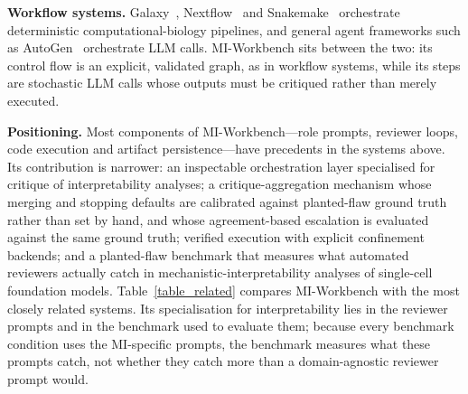 \noindent\textbf{Workflow systems.} Galaxy~\cite{afgan2018galaxy}, Nextflow~\cite{ditommaso2017nextflow} and Snakemake~\cite{molder2021sustainable} orchestrate deterministic computational-biology pipelines, and general agent frameworks such as AutoGen~\cite{wu2023autogen} orchestrate LLM calls. MI-Workbench sits between the two: its control flow is an explicit, validated graph, as in workflow systems, while its steps are stochastic LLM calls whose outputs must be critiqued rather than merely executed.

\noindent\textbf{Positioning.} Most components of MI-Workbench---role prompts, reviewer loops, code execution and artifact persistence---have precedents in the systems above. Its contribution is narrower: an inspectable orchestration layer specialised for critique of interpretability analyses; a critique-aggregation mechanism whose merging and stopping defaults are calibrated against planted-flaw ground truth rather than set by hand, and whose agreement-based escalation is evaluated against the same ground truth; verified execution with explicit confinement backends; and a planted-flaw benchmark that measures what automated reviewers actually catch in mechanistic-interpretability analyses of single-cell foundation models. Table~\ref{table_related} compares MI-Workbench with the most closely related systems. Its specialisation for interpretability lies in the reviewer prompts and in the benchmark used to evaluate them; because every benchmark condition uses the MI-specific prompts, the benchmark measures what these prompts catch, not whether they catch more than a domain-agnostic reviewer prompt would.

